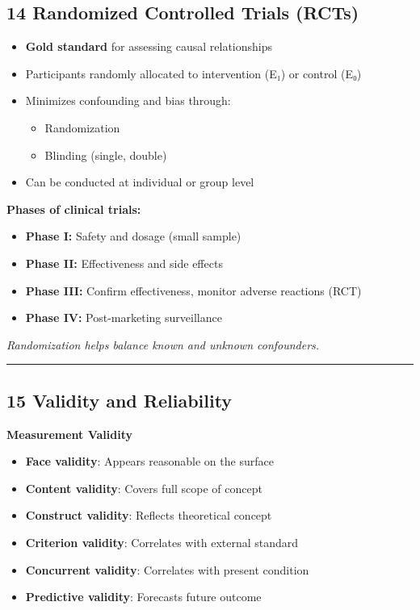 \documentclass[
  letterpaper,
  DIV=11,
  numbers=noendperiod]{scrartcl}
\providecommand{\tightlist}{%
  \setlength{\itemsep}{0pt}\setlength{\parskip}{0pt}}
\begin{document}
\subsection{\texorpdfstring{{14} {Randomized Controlled Trials
(RCTs)}}{14 Randomized Controlled Trials (RCTs)}}\label{randomized-controlled-trials-rcts}

\begin{itemize}
\tightlist
\item
  \textbf{Gold standard} for assessing causal relationships
\item
  Participants randomly allocated to intervention (E₁) or control (E₀)
\item
  Minimizes confounding and bias through:

  \begin{itemize}
  \tightlist
  \item
    Randomization
  \item
    Blinding (single, double)
  \end{itemize}
\item
  Can be conducted at individual or group level
\end{itemize}

\textbf{Phases of clinical trials:}

\begin{itemize}
\item
  \textbf{Phase I:} Safety and dosage (small sample)
\item
  \textbf{Phase II:} Effectiveness and side effects
\item
  \textbf{Phase III:} Confirm effectiveness, monitor adverse reactions
  (RCT)
\item
  \textbf{Phase IV:} Post-marketing surveillance
\end{itemize}

\emph{Randomization helps balance known and unknown confounders.}

\begin{center}\rule{0.5\linewidth}{0.5pt}\end{center}

\subsection{\texorpdfstring{{15} {Validity and
Reliability}}{15 Validity and Reliability}}\label{validity-and-reliability}

\textbf{Measurement Validity}

\begin{itemize}
\item
  \textbf{Face validity}: Appears reasonable on the surface
\item
  \textbf{Content validity}: Covers full scope of concept
\item
  \textbf{Construct validity}: Reflects theoretical concept
\item
  \textbf{Criterion validity}: Correlates with external standard
\item
  \textbf{Concurrent validity}: Correlates with present condition
\item
  \textbf{Predictive validity}: Forecasts future outcome
\end{itemize}
\end{document}
